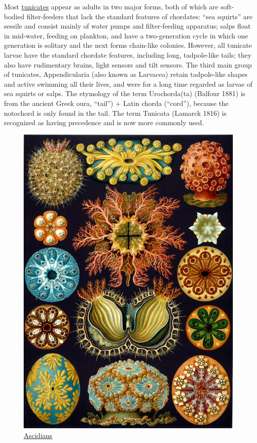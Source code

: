 Most \href{https://en.wikipedia.org/wiki/Tunicate}{tunicates} appear as
adults in two major forms, both of which are soft-bodied filter-feeders
that lack the standard features of chordates: ``sea squirts'' are
sessile and consist mainly of water pumps and filter-feeding apparatus;
salps float in mid-water, feeding on plankton, and have a two-generation
cycle in which one generation is solitary and the next forms chain-like
colonies. However, all tunicate larvae have the standard chordate
features, including long, tadpole-like tails; they also have rudimentary
brains, light sensors and tilt sensors. The third main group of
tunicates, Appendicularia (also known as Larvacea) retain tadpole-like
shapes and active swimming all their lives, and were for a long time
regarded as larvae of sea squirts or salps. The etymology of the term
Urochorda(ta) (Balfour 1881) is from the ancient Greek oura, ``tail'') +
Latin chorda (``cord''), because the notochord is only found in the
tail. The term Tunicata (Lamarck 1816) is recognized as having
precedence and is now more commonly used.

\begin{figure}

{\centering \includegraphics[width=0.7\linewidth]{./figures/echinodermata/Haeckel_Ascidiae}

}

\caption{\href{https://commons.wikimedia.org/wiki/File:Haeckel_Ascidiae.jpg}{Ascidians}}\label{fig:ascidians}
\end{figure}

